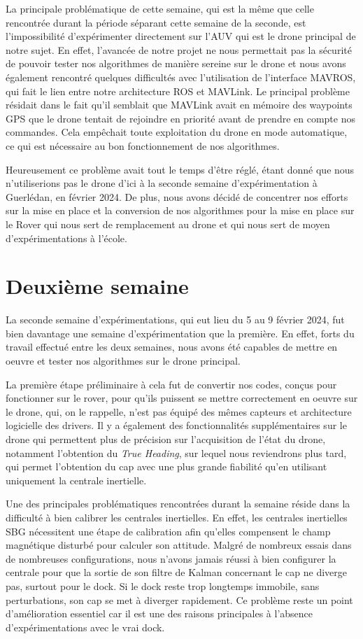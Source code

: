 \documentclass[12pt]{report}
\begin{document}
La principale problématique de cette semaine, qui est la même que celle rencontrée durant la période séparant cette semaine de la seconde, est l'impossibilité d'expérimenter directement sur l'AUV qui 
est le drone principal de notre sujet. En effet, l'avancée de notre projet ne nous permettait pas la sécurité de pouvoir tester nos algorithmes de manière sereine sur le drone et nous avons également 
rencontré quelques difficultés avec l'utilisation de l'interface MAVROS, qui fait le lien entre notre architecture ROS et MAVLink. Le principal problème résidait dans le fait qu'il semblait que MAVLink 
avait en mémoire des waypoints GPS que le drone tentait de rejoindre en priorité avant de prendre en compte nos commandes. Cela empêchait toute exploitation du drone en mode automatique, ce qui est nécessaire
au bon fonctionnement de nos algorithmes.

Heureusement ce problème avait tout le temps d'être réglé, étant donné que nous n'utiliserions pas le drone d'ici à la seconde semaine d'expérimentation à Guerlédan, en février 2024. De plus, nous avons 
décidé de concentrer nos efforts sur la mise en place et la conversion de nos algorithmes pour la mise en place sur le Rover qui nous sert de remplacement au drone et qui nous sert de moyen d'expérimentations à l'école. 


\section{Deuxième semaine}

La seconde semaine d'expérimentations, qui eut lieu du 5 au 9 février 2024, fut bien davantage une semaine d'expérimentation que la première. 
En effet, forts du travail effectué entre les deux semaines, nous avons été capables de mettre en oeuvre et tester nos algorithmes sur le drone principal.

La première étape préliminaire à cela fut de convertir nos codes, conçus pour fonctionner sur le rover, pour qu'ils puissent se mettre correctement en oeuvre sur le drone, qui, on le rappelle, n'est pas
équipé des mêmes capteurs et architecture logicielle des drivers. Il y a également des fonctionnalités supplémentaires sur le drone qui permettent plus de précision sur l'acquisition de l'état du drone, notamment 
l'obtention du \textit{True Heading}, sur lequel nous reviendrons plus tard, qui permet l'obtention du cap avec une plus grande fiabilité qu'en utilisant uniquement la centrale inertielle. 

Une des principales problématiques rencontrées durant la semaine réside dans la difficulté à bien calibrer les centrales inertielles. En effet, les centrales inertielles SBG nécessitent une étape de calibration
afin qu'elles compensent le champ magnétique disturbé pour calculer son attitude. Malgré de nombreux essais dans de nombreuses configurations, nous n'avons jamais réussi à bien configurer la centrale 
pour que la sortie de son filtre de Kalman concernant le cap ne diverge pas, surtout pour le dock. Si le dock reste trop longtemps immobile, sans perturbations, son cap se met à diverger rapidement.
Ce problème reste un point d'amélioration essentiel car il est une des raisons principales à l'absence d'expérimentations avec le vrai dock. 
\end{document}
